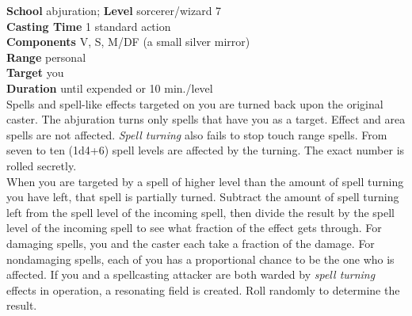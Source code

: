 \textbf{School} abjuration; \textbf{Level} sorcerer/wizard 7\\
\textbf{Casting Time} 1 standard action\\
\textbf{Components} V, S, M/DF (a small silver mirror)\\
\textbf{Range} personal\\
\textbf{Target} you\\
\textbf{Duration} until expended or 10 min./level\\
Spells and spell-like effects targeted on you are turned back upon the original caster. The abjuration turns only spells that have you as a target. Effect and area spells are not affected. \textit{Spell turning }also fails to stop touch range spells. From seven to ten (1d4+6) spell levels are affected by the turning. The exact number is rolled secretly.\\
When you are targeted by a spell of higher level than the amount of spell turning you have left, that spell is partially turned. Subtract the amount of spell turning left from the spell level of the incoming spell, then divide the result by the spell level of the incoming spell to see what fraction of the effect gets through. For damaging spells, you and the caster each take a fraction of the damage. For nondamaging spells, each of you has a proportional chance to be the one who is affected. If you and a spellcasting attacker are both warded by \textit{spell turning }effects in operation, a resonating field is created. Roll randomly to determine the result.\\
